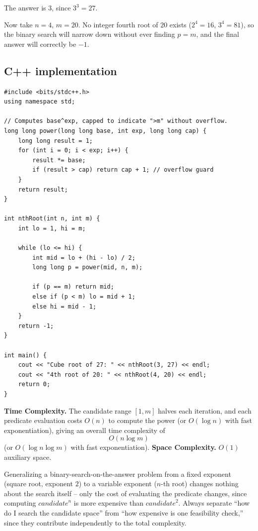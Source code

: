 The answer is $3$, since $3^3 = 27$.

Now take $n=4$, $m=20$. No integer fourth root of $20$ exists ($2^4=16$,
$3^4=81$), so the binary search will narrow down without ever finding
$p=m$, and the final answer will correctly be $-1$.

\subsection*{C++ implementation}

\begin{lstlisting}
#include <bits/stdc++.h>
using namespace std;

// Computes base^exp, capped to indicate ">m" without overflow.
long long power(long long base, int exp, long long cap) {
    long long result = 1;
    for (int i = 0; i < exp; i++) {
        result *= base;
        if (result > cap) return cap + 1; // overflow guard
    }
    return result;
}

int nthRoot(int n, int m) {
    int lo = 1, hi = m;

    while (lo <= hi) {
        int mid = lo + (hi - lo) / 2;
        long long p = power(mid, n, m);

        if (p == m) return mid;
        else if (p < m) lo = mid + 1;
        else hi = mid - 1;
    }
    return -1;
}

int main() {
    cout << "Cube root of 27: " << nthRoot(3, 27) << endl;
    cout << "4th root of 20: " << nthRoot(4, 20) << endl;
    return 0;
}
\end{lstlisting}

\begin{complexitybox}
\textbf{Time Complexity.} The candidate range $[1, m]$ halves each
iteration, and each predicate evaluation costs $O(n)$ to compute the
power (or $O(\log n)$ with fast exponentiation), giving an overall time
complexity of
\[
  O(n \log m)
\]
(or $O(\log n \log m)$ with fast exponentiation).
\textbf{Space Complexity.} $O(1)$ auxiliary space.
\end{complexitybox}

\begin{takeawaybox}
Generalizing a binary-search-on-the-answer problem from a fixed exponent
(square root, exponent $2$) to a variable exponent ($n$-th root) changes
nothing about the search itself -- only the cost of evaluating the
predicate changes, since computing $\textit{candidate}^n$ is more expensive
than $\textit{candidate}^2$. Always separate ``how do I search the
candidate space'' from ``how expensive is one feasibility check,'' since
they contribute independently to the total complexity.
\end{takeawaybox}
